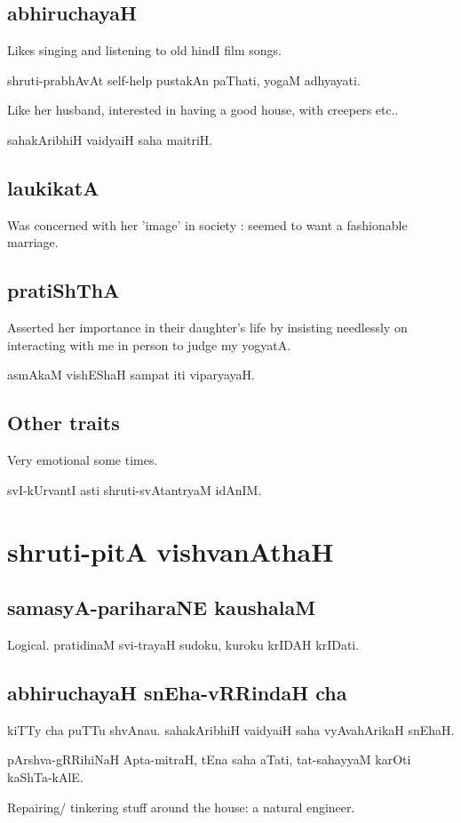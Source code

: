 \documentclass[oneside, article]{memoir}
\begin{document}
\section{abhiruchayaH}
Likes singing and listening to old hindI film songs.

shruti-prabhAvAt self-help pustakAn paThati, yogaM adhyayati.

Like her husband, interested in having a good house, with creepers etc..

sahakAribhiH vaidyaiH saha maitriH.

\section{laukikatA}
Was concerned with her 'image' in society : seemed to want a fashionable marriage.

\section{pratiShThA}
Asserted her importance in their daughter's life by insisting needlessly on interacting with me in person to judge my yogyatA.

asmAkaM vishEShaH sampat iti viparyayaH.

\section{Other traits}
Very emotional some times.

svI-kUrvantI asti shruti-svAtantryaM idAnIM.

\chapter{shruti-pitA vishvanAthaH}
\section{samasyA-pariharaNE kaushalaM}
Logical. pratidinaM svi-trayaH sudoku, kuroku krIDAH krIDati.

\section{abhiruchayaH snEha-vRRindaH cha}
kiTTy cha puTTu shvAnau. sahakAribhiH vaidyaiH saha vyAvahArikaH snEhaH.

pArshva-gRRihiNaH Apta-mitraH, tEna saha aTati, tat-sahayyaM karOti kaShTa-kAlE.

Repairing/ tinkering stuff around the house: a natural engineer.
\end{document}
